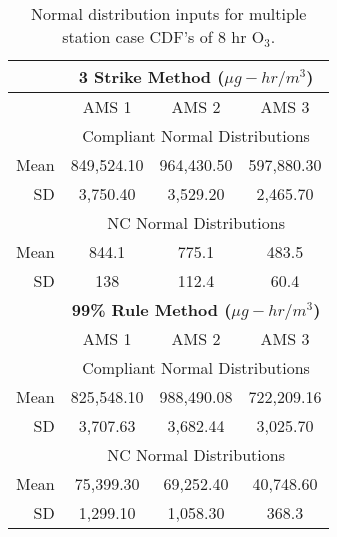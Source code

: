 % 
\begin{table}[H]
\centering
\caption{Parameters for multiple station case of 8 hr O$_{3}$}
\label{tb14:multiParamO3}
\end{table}
%
\begin{table}[H]
\centering
\caption{Normal distribution inputs for multiple station case CDF’s of 8 hr O$_{3}$.}
\label{tb15:normalinputs03}
\begin{tabular}{@{}rccc@{}}
\toprule
 & \multicolumn{3}{c}{\textbf{3 Strike Method ($\mu g-hr/m^{3}$)}} \\ \midrule
 & AMS 1 & AMS 2 & AMS 3 \\
 & \multicolumn{3}{c}{Compliant Normal Distributions} \\
Mean & 849,524.10 & 964,430.50 & 597,880.30 \\
SD & 3,750.40 & 3,529.20 & 2,465.70 \\
 & \multicolumn{3}{c}{NC Normal Distributions} \\
Mean & 844.1 & 775.1 & 483.5 \\
SD & 138 & 112.4 & 60.4 \\
 & \multicolumn{3}{c}{\textbf{99\% Rule Method ($\mu g-hr/m^{3}$)}} \\
 & AMS 1 & AMS 2 & AMS 3 \\
 & \multicolumn{3}{c}{Compliant Normal Distributions} \\
Mean & 825,548.10 & 988,490.08 & 722,209.16 \\
SD & 3,707.63 & 3,682.44 & 3,025.70 \\
 & \multicolumn{3}{c}{NC Normal Distributions} \\
Mean & 75,399.30 & 69,252.40 & 40,748.60 \\
SD & 1,299.10 & 1,058.30 & 368.3 \\ \bottomrule
\end{tabular}
\end{table}

